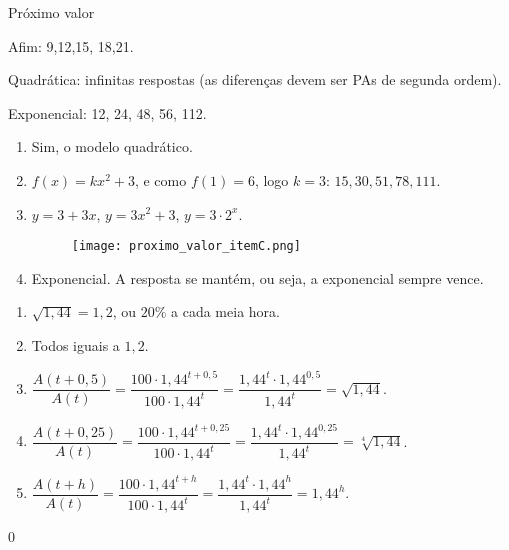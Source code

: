 \begin{answer}{Próximo valor}
{
Afim: 9,12,15, 18,21.

Quadrática: infinitas respostas (as diferenças devem ser PAs de segunda ordem).

Exponencial: 12, 24, 48, 56, 112.

\begin{enumerate}

\item Sim, o modelo quadrático.

\item $f(x)=kx^2+3$, e como $f(1)=6$, logo $k=3$: $15, 30, 51, 78, 111$.

\item $y=3+3x$, $y=3x^2+3$, $y=3\cdot 2^x$.

\begin{figure}[H]
\centering
\noindent\texttt{[image: proximo\_valor\_itemC.png]}
\end{figure}

\item Exponencial. A resposta se mantém, ou seja, a exponencial sempre vence.

\end{enumerate}


\begin{enumerate}
\item $\sqrt{1,44}=1,2$, ou $20\%$ a cada meia hora.

\item Todos iguais a $1,2$.

\item $\dfrac{A(t+0,5)}{A(t)}=\dfrac{100\cdot 1,44^{t+0,5}}{100\cdot 1,44^t}=\dfrac{1,44^t \cdot 1,44^{0,5}}{1,44^t}=\sqrt{1,44}$.

\item $\dfrac{A(t+0,25)}{A(t)}=\dfrac{100\cdot 1,44^{t+0,25}}{100\cdot 1,44^t}=\dfrac{1,44^t \cdot 1,44^{0,25}}{1,44^t}=\sqrt[4]{1,44}$.

\item $\dfrac{A(t+h)}{A(t)}=\dfrac{100\cdot 1,44^{t+h}}{100\cdot 1,44^t}=\dfrac{1,44^t \cdot 1,44^{h}}{1,44^t}=1,44^h$.

\end{enumerate}
}{0}
\end{answer}


